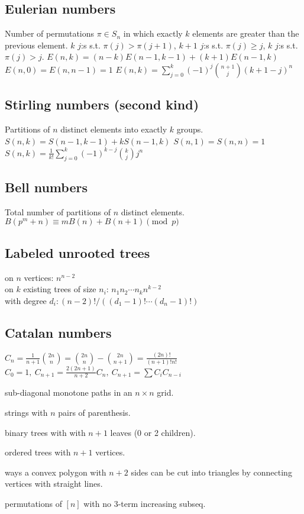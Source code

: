 	\subsection{Eulerian numbers}
		Number of permutations $\pi \in S_n$ in which exactly $k$ elements are greater than the previous element. $k$ $j$:s s.t. $\pi(j)>\pi(j+1)$, $k+1$ $j$:s s.t. $\pi(j)\geq j$, $k$ $j$:s s.t. $\pi(j)>j$.
		$E(n,k) = (n-k)E(n-1,k-1) + (k+1)E(n-1,k)$
		$E(n,0) = E(n,n-1) = 1$
		$E(n,k) = \sum_{j=0}^k(-1)^j\binom{n+1}{j}(k+1-j)^n$

	\subsection{Stirling numbers (second kind)}
		Partitions of $n$ distinct elements into exactly $k$ groups.
		$S(n,k) = S(n-1,k-1) + k S(n-1,k)$
		$S(n,1) = S(n,n) = 1$
		$S(n,k) = \frac{1}{k!}\sum_{j=0}^k (-1)^{k-j}\binom{k}{j}j^n$

	\subsection{Bell numbers}
		Total number of partitions of $n$ distinct elements. 
		$B(p^m+n)\equiv mB(n)+B(n+1) \pmod{p}$

	\subsection{Labeled unrooted trees}
		on $n$ vertices: $n^{n-2}$ \\
		on $k$ existing trees of size $n_i$: $n_1n_2\cdots n_k n^{k-2}$ \\
		with degree $d_i: (n-2)! / ((d_1-1)! \cdots (d_n-1)!)$

	\subsection{Catalan numbers}
		$C_n=\frac{1}{n+1}\binom{2n}{n}= \binom{2n}{n}-\binom{2n}{n+1} = \frac{(2n)!}{(n+1)!n!}$
		$ C_0=1,\ C_{n+1} = \frac{2(2n+1)}{n+2}C_n,\ C_{n+1}=\sum C_iC_{n-i}$
		\begin{itemize*}[noitemsep]
			\item sub-diagonal monotone paths in an $n\times n$ grid.
			\item strings with $n$ pairs of parenthesis.
			\item binary trees with with $n+1$ leaves (0 or 2 children).
			\item ordered trees with $n+1$ vertices.
			\item ways a convex polygon with $n+2$ sides can be cut into triangles by connecting vertices with straight lines.
			\item permutations of $[n]$ with no 3-term increasing subseq.
		\end{itemize*}
